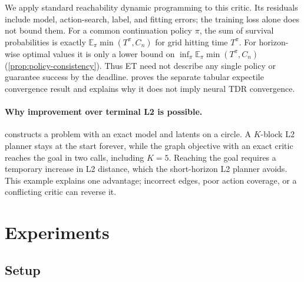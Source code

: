 \documentclass{article} %
\newcommand{\EE}{\mathbb E}
\theoremstyle{definition}
\theoremstyle{remark}
\newcommand{\todo}[1]{\textcolor{red}{[TODO: #1]}}
\newcommand{\keypoints}[1]{\par\medskip\noindent\fcolorbox{black!50}{black!5}{\begin{minipage}{0.96\linewidth}\small
\textbf{Key points this section must land.}\begin{itemize}[nosep,leftmargin=1.2em]#1\end{itemize}\end{minipage}}\par\medskip}
\begin{document}
We apply standard reachability dynamic programming \citep{abate2008} to this critic.
Its residuals include model, action-search, label, and fitting errors; the training loss
alone does not bound them. For a common continuation policy $\pi$, the sum of survival
probabilities is exactly $\EE_\pi\min(T^\pi,C_n)$ for grid hitting time $T^\pi$.
For horizon-wise optimal values it is only a lower bound on
$\inf_\pi\EE_\pi\min(T^\pi,C_n)$ (\cref{prop:policy-consistency}).
Thus ET need not describe any single policy or guarantee success by the deadline.
 proves the separate tabular expectile convergence result and explains
why it does not imply neural TDR convergence.

\paragraph{Why improvement over terminal L2 is possible.}
 constructs a problem with an exact model and latents on a circle.
A $K$-block L2 planner stays at the start forever, while the graph objective with an exact
critic reaches the goal in two calls, including $K=5$. Reaching the goal requires a temporary
increase in L2 distance, which the short-horizon L2 planner avoids. This example explains
one advantage; incorrect edges, poor action coverage, or a conflicting critic can reverse it.


\section{Experiments}
\label{sec:experiments}

\subsection{Setup}
\label{sec:setup}
\end{document}

